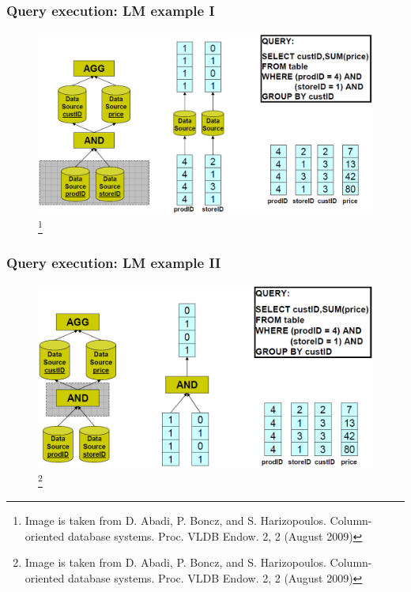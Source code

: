 \documentclass[compress, dvipsnames, unicode]{beamer}
\begin{document}
\begin{frame}
\frametitle{Query execution: LM example I}

\begin{figure}[htb]
\includegraphics[width=\textwidth,height=0.75\textheight,keepaspectratio]{lm1.png} 
\footnote{\tiny{Image is taken from D. Abadi, P. Boncz, and S. Harizopoulos. Column-oriented database systems. Proc. VLDB Endow. 2, 2 (August 2009)}}
\end{figure}    

\end{frame}

\begin{frame}
\frametitle{Query execution: LM example II}

\begin{figure}[htb]
\includegraphics[width=\textwidth,height=0.75\textheight,keepaspectratio]{lm2.png} 
\footnote{\tiny{Image is taken from D. Abadi, P. Boncz, and S. Harizopoulos. Column-oriented database systems. Proc. VLDB Endow. 2, 2 (August 2009)}}
\end{figure}    

\end{frame}
\end{document}
